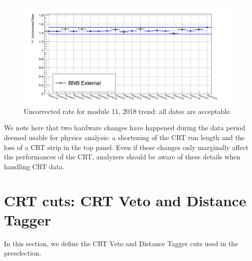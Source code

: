 \begin{figure}[h!]
\centering
\includegraphics[scale=0.4]{images/hHitsOverEvt_FEB_11.png}
\caption{Uncorrected rate for module 11, 2018 trend: all dates are acceptable.}
\label{Annual11_ex}
\end{figure}


We note here that two hardware changes have happened during the data period deemed usable for physics analysis: a shortening of the CRT run length and the loss of a CRT strip in the top panel. Even if these changes only marginally affect the performances of the CRT, analyzers should be aware of these details when handling CRT data.

\clearpage

\section{CRT cuts: CRT Veto and Distance Tagger}\label{sec:Cuts}
In this section, we define the  CRT Veto and Distance Tagger cuts used in the preselection.
